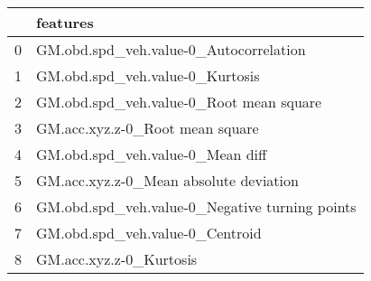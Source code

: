 \begin{tabular}{ll}
\toprule
{} &                                        features \\
\midrule
0 &          GM.obd.spd\_veh.value-0\_Autocorrelation \\
1 &                 GM.obd.spd\_veh.value-0\_Kurtosis \\
2 &         GM.obd.spd\_veh.value-0\_Root mean square \\
3 &                 GM.acc.xyz.z-0\_Root mean square \\
4 &                GM.obd.spd\_veh.value-0\_Mean diff \\
5 &          GM.acc.xyz.z-0\_Mean absolute deviation \\
6 &  GM.obd.spd\_veh.value-0\_Negative turning points \\
7 &                 GM.obd.spd\_veh.value-0\_Centroid \\
8 &                         GM.acc.xyz.z-0\_Kurtosis \\
\bottomrule
\end{tabular}
